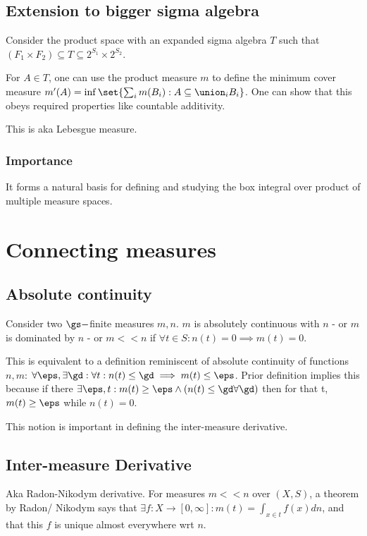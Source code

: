 \documentclass[oneside, article]{memoir}
\begin{document}
\subsection{Extension to bigger sigma algebra}
Consider the product space with an expanded sigma algebra $T$ such that $(F_1 \times F_2) \subseteq T \subseteq 2^{S_1} \times 2^{S_2}$.

For $A \in T$, one can use the product measure $m$ to define the minimum cover measure $m'(A) = \inf \set{\sum_i m(B_i) : A \subseteq \union_i B_i}$. One can show that this obeys required properties like countable additivity.

This is aka Lebesgue measure.

\subsubsection{Importance}
It forms a natural basis for defining and studying the box integral over product of multiple measure spaces.

\section{Connecting measures}
\subsection{Absolute continuity}
Consider two $\gs-$finite measures $m, n$. $m$ is absolutely continuous with $n$ - or $m$ is dominated by $n$ - or $m << n$ if $\forall t \in S: n(t) = 0 \implies m(t) = 0$.

This is equivalent to a definition reminiscent of absolute continuity of functions $n, m$: $\forall \eps, \exists \gd: \forall t: n(t) \leq \gd \implies m(t) \leq \eps$. Prior definition implies this because if there $\exists \eps, t: m(t) \geq \eps \land (n(t) \leq \gd \forall \gd)$ then for that t, $m(t) \geq \eps$ while $n(t) = 0$.

This notion is important in defining the inter-measure derivative.

\subsection{Inter-measure Derivative}
Aka Radon-Nikodym derivative. For measures $m<<n$ over $(X, S)$, a theorem by Radon/ Nikodym says that $\exists f:X \to [0, \infty]: m(t) = \int_{x \in t} f(x) dn$, and that this $f$ is unique almost everywhere wrt $n$. \why
\end{document}

